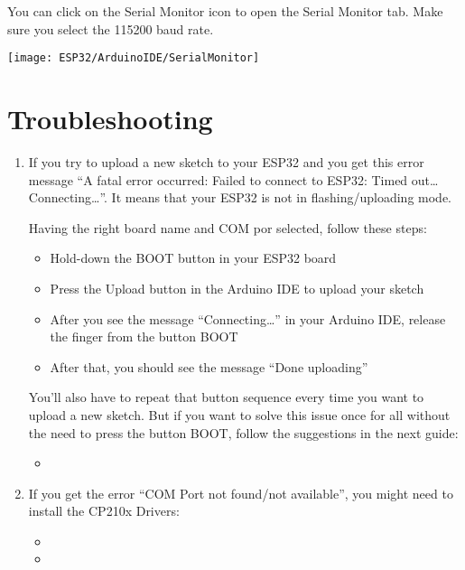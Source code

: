You can click on the Serial Monitor icon to open the Serial Monitor tab. Make sure you select the 115200 baud rate.        

        \texttt{[image: ESP32/ArduinoIDE/SerialMonitor]}

\section{Troubleshooting}


\begin{enumerate}
  \item If you try to upload a new sketch to your ESP32 and you get this error message ``A fatal error occurred: Failed to connect to ESP32: Timed out\ldots Connecting\ldots''. It means that your ESP32 is not in flashing/uploading mode.

  \bigskip
  
  Having the right board name and COM por selected, follow these steps:
  
  \begin{itemize}
    \item Hold-down the BOOT button in your ESP32 board
    \item Press the Upload button in the Arduino IDE to upload your sketch
    \item After you see the  message ``Connecting\ldots'' in your Arduino IDE, release the finger from the button BOOT
    \item After that, you should see the message ``Done uploading''
  \end{itemize}


  \medskip
  
  You'll also have to repeat that button sequence every time you want to upload a new sketch. But if you want to solve this issue once for all without the need to press the button BOOT, follow the suggestions in the next guide:

  \begin{itemize}
    \item {}
  \end{itemize}

  \item  If you get the error ``COM Port not found/not available'', you might need to install the CP210x Drivers:

  \begin{itemize}
    \item {}
    \item {}
  \end{itemize}

\end{enumerate}


